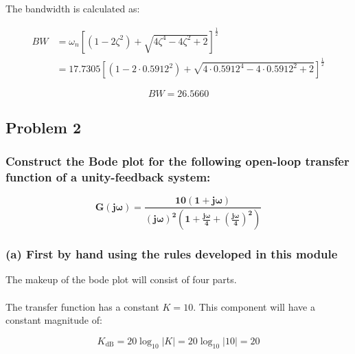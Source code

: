 \documentclass[12pt, letterpaper]{../assignment}
\begin{document}
The bandwidth is calculated as:

\begin{equation*}
    \begin{aligned}
        BW &= \omega_n \left[ (1 - 2 \zeta^2) + \sqrt{ 4 \zeta^4 - 4 \zeta^2 + 2 } \right]^{\frac{1}{2}}\\
           &= 17.7305 \left[ (1 - 2 \cdot 0.5912^2) + \sqrt{ 4 \cdot 0.5912^4 - 4 \cdot 0.5912^2 + 2 } \right]^{\frac{1}{2}}
    \end{aligned}
\end{equation*}

\begin{answer}
    $$ BW = 26.5660$$
\end{answer}

\subsection*{Problem 2}
\subsubsection*{Construct the Bode plot for the following open-loop transfer function
of a unity-feedback system:}

$$ \mathbf{G(j\omega) = \frac{10(1+j\omega)}{(j\omega)^2 \left( 1 + \frac{j\omega}{4} + \left(\frac{j\omega}{4}\right)^2\right) } }$$


\subsubsection*{(a) First by hand using the rules developed in this module}

The makeup of the bode plot will consist of four parts.
\\\\
The transfer function has a constant $K=10$. This component will have a constant magnitude of:

$$ K_\text{dB} = 20 \log_{10} |K| = 20 \log_{10} |10| = 20 $$
\end{document}

